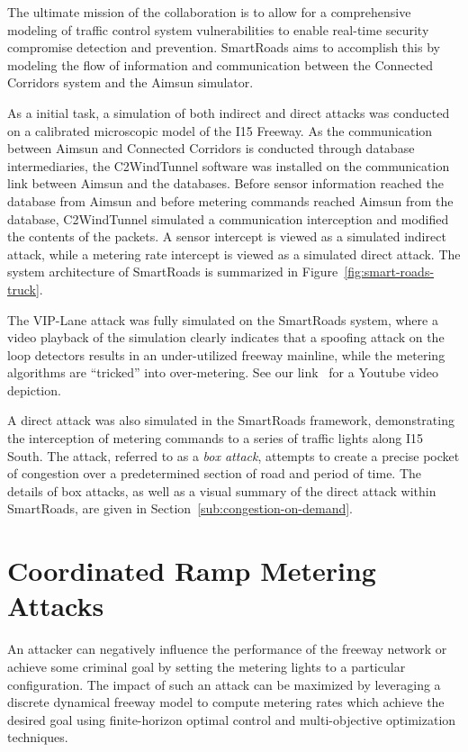 The ultimate mission of the collaboration is to allow for a comprehensive modeling of traffic control system vulnerabilities to enable real-time security compromise detection and prevention. SmartRoads aims to accomplish this by modeling the flow of information and communication between the Connected Corridors system and the Aimsun simulator.

As a initial task, a simulation of both indirect and direct attacks was conducted on a calibrated microscopic model of the I15 Freeway. As the communication between Aimsun and Connected Corridors is conducted through database intermediaries, the C2WindTunnel software was installed on the communication link between Aimsun and the databases. Before sensor information reached the database from Aimsun and before metering commands reached Aimsun from the database, C2WindTunnel simulated a communication interception and modified the contents of the packets. A sensor intercept is viewed as a simulated indirect attack, while a metering rate intercept is viewed as a simulated direct attack. The system architecture of SmartRoads is summarized in Figure~\ref{fig:smart-roads-truck}.

The VIP-Lane attack was fully simulated on the SmartRoads system, where a video playback of the simulation clearly indicates that a spoofing attack on the loop detectors results in an under-utilized freeway mainline, while the metering algorithms are ``tricked'' into over-metering.  See our link~\cite{smartroadswebsite} for a Youtube video depiction.

A direct attack was also simulated in the SmartRoads framework, demonstrating the interception of metering commands to a series of traffic lights along I15 South. The attack, referred to as a \emph{box attack}, attempts to create a precise pocket of congestion over a predetermined section of road and period of time. The details of box attacks, as well as a visual summary of the direct attack within SmartRoads, are given in Section~\ref{sub:congestion-on-demand}.


\section{Coordinated Ramp Metering Attacks}
\label{sec:problemformulation}

An attacker can negatively influence the performance of the freeway network or achieve some criminal goal by setting the metering lights to a particular configuration. The impact of such an attack can be maximized by leveraging a discrete dynamical freeway model to compute metering rates which achieve the desired goal using finite-horizon optimal control and multi-objective optimization techniques.

